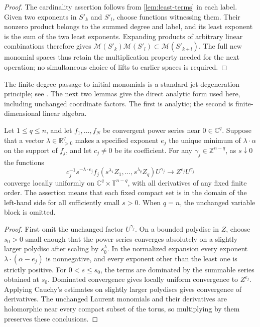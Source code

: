 \begin{proof}
The cardinality assertion follows from \cref{lem:least-terms} in each label. Given two exponents in $S'_k$ and $S'_l$, choose functions witnessing them. Their nonzero product belongs to the summed degree and label, and its least exponent is the sum of the two least exponents. Expanding products of arbitrary linear combinations therefore gives $\mathcal{M}(S'_k)\mathcal{M}(S'_l)\subset\mathcal{M}(S'_{k+l})$. The full new monomial spaces thus retain the multiplication property needed for the next operation; no simultaneous choice of lifts to earlier spaces is required.
\end{proof}

The finite-degree passage to initial monomials is a standard jet-degeneration principle; see \textcite[Proposition~5.7]{Ito2013}. The next two lemmas give the direct analytic form used here, including unchanged coordinate factors. The first is analytic; the second is finite-dimensional linear algebra.

\begin{lemma}
\label{lem:weighted-limit}
Let $1\leq q\leq n$, and let $f_1,\ldots,f_N$ be convergent power series near $0\in\mathbb{C}^q$. Suppose that a vector $\lambda\in\mathbb{R}_{>0}^q$ makes a specified exponent $e_j$ the unique minimum of $\lambda\cdot\alpha$ on the support of $f_j$, and let $c_j\ne0$ be its coefficient. For any $\gamma_j\in\mathbb{Z}^{n-q}$, as $s\downarrow0$ the functions
\begin{equation}\label{eq:weighted-limit}
 c_j^{-1}s^{-\lambda\cdot e_j}
 f_j(s^{\lambda_1}Z_1,\ldots,s^{\lambda_q}Z_q)U^{\gamma_j}
 \longrightarrow Z^{e_j}U^{\gamma_j}
\end{equation}
converge locally uniformly on $\mathbb{C}^q\times\mathbb{T}^{n-q}$, with all derivatives of any fixed finite order. The assertion means that each fixed compact set is in the domain of the left-hand side for all sufficiently small $s>0$. When $q=n$, the unchanged variable block is omitted.
\end{lemma}

\begin{proof}
First omit the unchanged factor $U^{\gamma_j}$. On a bounded polydisc in $Z$, choose $s_0>0$ small enough that the power series converges absolutely on a slightly larger polydisc after scaling by $s_0^\lambda$. In the normalized expansion every exponent $\lambda\cdot(\alpha-e_j)$ is nonnegative, and every exponent other than the least one is strictly positive. For $0<s\leq s_0$, the terms are dominated by the summable series obtained at $s_0$. Dominated convergence gives locally uniform convergence to $Z^{e_j}$. Applying Cauchy's estimates on slightly larger polydiscs gives convergence of derivatives. The unchanged Laurent monomials and their derivatives are holomorphic near every compact subset of the torus, so multiplying by them preserves these conclusions.
\end{proof}

